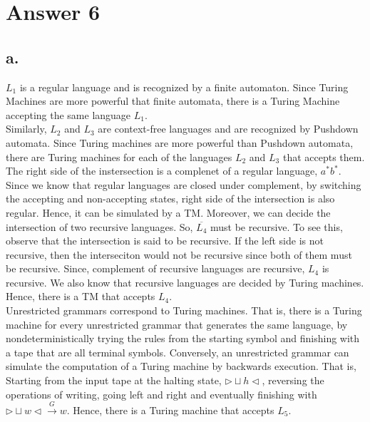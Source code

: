\documentclass[12pt]{article}
\begin{document}
\section*{Answer 6}

\subsection*{a.}
\-\hspace{1cm} $L_1$ is a regular language and is recognized by a finite automaton. Since Turing Machines are more powerful that finite automata, there is a Turing Machine accepting the same language $L_1$.\\
\-\hspace{1cm}
Similarly, $L_2$ and $L_3$ are context-free languages and are recognized by Pushdown automata. Since Turing machines are more powerful than Pushdown automata, there are Turing machines for each of the languages $L_2$ and $L_3$ that accepts them.\\
\-\hspace{1cm}The right side of the instersection is a complenet of a regular language, $a^*b^*$. Since we know that regular languages are closed under complement, by switching the accepting and non-accepting states, right side of the intersection is also regular. Hence, it can be simulated by a TM. Moreover, we can decide the intersection of two recursive languages. So, $\overline{L_4}$ must be recursive. To see this, observe that the intersection is said to be recursive. If the left side is not recursive, then the interseciton would not be recursive since both of them must be recursive. Since, complement of recursive languages are recursive, $L_4$ is recursive. We also know that recursive languages are decided by Turing machines. Hence, there is a TM that accepts $L_4$.\\
\-\hspace{1cm}Unrestricted grammars correspond to Turing machines. That is, there is a Turing machine for every unrestricted grammar that generates the same language, by nondeterministically trying the rules from the starting symbol and finishing with a tape that are all terminal symbols. Conversely, an unrestricted grammar can simulate the computation of a Turing machine by backwards execution. That is, Starting from the input tape at the halting state, $\triangleright\sqcup h\triangleleft$, reversing the operations of writing, going left and right and eventually finishing with $\triangleright\sqcup w\triangleleft\xrightarrow{G} w$. Hence, there is a Turing machine that accepts $L_5$.
\end{document}

